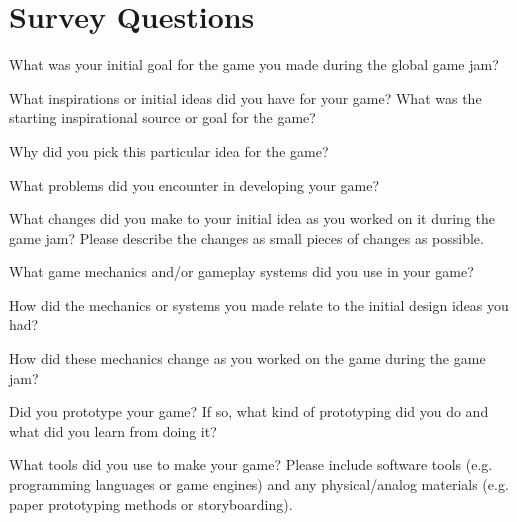 \documentclass{sig-alternate}
\begin{document}


\appendix
{}
\section{Survey Questions}
\label{sec:survey}
\begin{list}{}{\leftmargin=10pt \itemindent=0em \itemsep=0pt}
\item What was your initial goal for the game you made during the global game jam?
\item What inspirations or initial ideas did you have for your game? What was the starting inspirational source or goal for the game?
\item Why did you pick this particular idea for the game?
\item What problems did you encounter in developing your game?
\item What changes did you make to your initial idea as you worked on it during the game jam? Please describe the changes as small pieces of changes as possible.
\item What game mechanics and/or gameplay systems did you use in your game?
\item How did the mechanics or systems you made relate to the initial design ideas you had?
\item How did these mechanics change as you worked on the game during the game jam?
\item Did you prototype your game? If so, what kind of prototyping did you do and what did you learn from doing it?
\item What tools did you use to make your game? Please include software tools (e.g. programming languages or game engines) and any physical/analog materials (e.g. paper prototyping methods or storyboarding).
\end{list}
\end{document}

